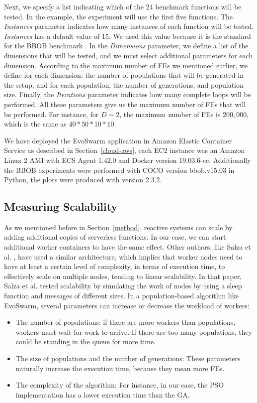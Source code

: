 \documentclass[review]{elsarticle}
\begin{document}
Next, we specify a list indicating which of the 24 benchmark
functions will be tested. In the example, the experiment will use the first five
functions.  The {\em Instances} parameter indicates how many instances of each
function will be tested. {\em Instances}  has a default value of 15. We used this
value because it is the standard for the BBOB benchmark \cite{hansen2016coco}.
In the {\em Dimensions} parameter, we define a list of the dimensions that will
be tested, and we must select additional parameters for each dimension.
According to the maximum number of FEs we mentioned
earlier, we define for each dimension: the number of populations that will be
generated in the setup, and for each population,  the number of generations, and
population size. Finally, the {\em Iterations} parameter indicates how many
complete loops will be performed. All these parameters give us the maximum
number of FEs that will be performed. For instance, for $D = 2$, the maximum
number of FEs is $200,000$, which is the same as $40*50*10*10$.

We have deployed the EvoSwarm application in Amazon Elastic Container Service as 
described in Section~\ref{cloud-aws}, each EC2 instance was an Amazon Linux 2 AMI with 
ECS Agent 1.42.0 and Docker version 19.03.6-ce. Additionally the BBOB experiments 
were performed with COCO \cite{hansen2016coco} version bbob.v15.03
in Python, the plots were produced with version 2.3.2.

\subsection{Measuring Scalability}
\label{sec:exp1}

As we mentioned before in Section~\ref{method}, reactive systems can scale by adding additional copies
of serverless functions. In our case, we can start additional worker containers
to have the same effect. Other authors, like Salza et al. \cite{salza2019speed},
have used a similar architecture, which implies that worker nodes need to have at least a certain level
of complexity, in terms of execution time,  to effectively scale on multiple
nodes, tending to linear scalability. In that paper, Salza et al. tested scalability
by simulating the work of nodes by using a sleep function and messages of different sizes.
In a population-based algorithm like EvoSwarm, several parameters can increase or 
decrease the workload of workers:

\begin{itemize}
    \item The number of populations: if there are more workers than populations, workers
    must wait for work to arrive. If there are too many populations, they could be
    standing in the queue for more time.
    \item The size of populations and the number of generations:
    These parameters naturally increase the execution time, because they mean more FEs.
    \item The complexity of the algorithm: For instance, in our case,
    the PSO implementation has a lower execution time than the GA.
\end{itemize}
\end{document}

